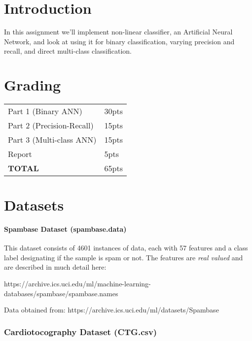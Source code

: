 \documentclass[12pt]{article}
\begin{document}
\maketitle


\section*{Introduction}
In this assignment we'll implement non-linear classifier, an Artificial Neural Network, and look at using it for binary classification, varying precision and recall, and direct multi-class classification.  


\section*{Grading}
\begin{table}[h]
\begin{center}
\begin{tabular}{|l|l|}
\hline
Part 1 (Binary ANN) & 30pts\\
Part 2 (Precision-Recall) & 15pts\\
Part 3 (Multi-class ANN) & 15pts\\
Report & 5pts\\
\hline
\textbf{TOTAL} & 65pts\\
\hline
\end{tabular}
\end{center}
\end{table}

\newpage
\section*{Datasets}
\paragraph{Spambase Dataset  (spambase.data)}
This dataset consists of 4601 instances of data, each with 57 features and a class label designating if the sample is spam or not.
The features are \emph{real valued} and are described in much detail here:
\begin{center}
  https://archive.ics.uci.edu/ml/machine-learning-databases/spambase/spambase.names\\
\end{center}

\noindent
Data obtained from:  https://archive.ics.uci.edu/ml/datasets/Spambase

\subsubsection*{Cardiotocography Dataset  (CTG.csv)}
\end{document}
